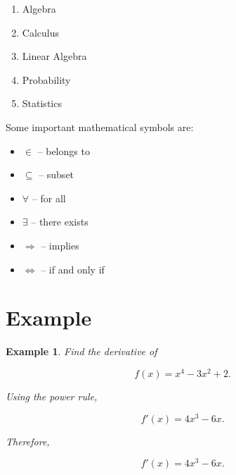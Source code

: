 \documentclass[12pt,a4paper]{article}
\newtheorem{example}{Example}
\begin{document}
\begin{enumerate}
    \item Algebra
    \item Calculus
    \item Linear Algebra
    \item Probability
    \item Statistics
\end{enumerate}

Some important mathematical symbols are:

\begin{itemize}
    \item \(\in\) -- belongs to
    \item \(\subseteq\) -- subset
    \item \(\forall\) -- for all
    \item \(\exists\) -- there exists
    \item \(\Rightarrow\) -- implies
    \item \(\Leftrightarrow\) -- if and only if
\end{itemize}

\section{Example}

\begin{example}
Find the derivative of

\[
f(x)=x^4-3x^2+2.
\]

Using the power rule,

\[
f'(x)
=
4x^3-6x.
\]

Therefore,

\[
\boxed{f'(x)=4x^3-6x}.
\]
\end{example}

\end{document}
